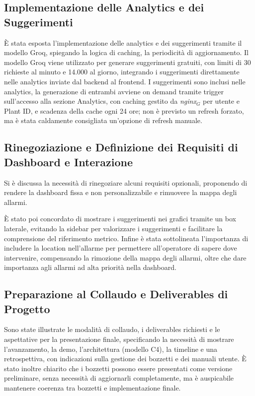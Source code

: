 \documentclass[10pt, letterpaper]{article}
\begin{document}
\subsection*{Implementazione delle Analytics e dei Suggerimenti}
È stata esposta l'implementazione delle analytics e dei suggerimenti tramite il modello Groq, spiegando la logica di caching, la periodicità di aggiornamento.
Il modello Groq viene utilizzato per generare suggerimenti gratuiti, con limiti di 30 richieste al minuto e 14.000 al giorno, integrando i suggerimenti direttamente nelle analytics inviate dal backend al frontend.
I suggerimenti sono inclusi nelle analytics, la generazione di entrambi avviene on demand tramite trigger sull'accesso alla sezione Analytics, con caching gestito da \textit{nginx$_G$} per utente e Plant ID,
e scadenza della cache ogni 24 ore; non è previsto un refresh forzato, ma è stata caldamente consigliata un'opzione di refresh manuale. 

\subsection*{Rinegoziazione e Definizione dei Requisiti di Dashboard e Interazione}
Si è discussa la necessità di rinegoziare alcuni requisiti opzionali, proponendo di rendere la dashboard fissa e non personalizzabile e rimuovere la mappa degli allarmi.

È stato poi concordato di mostrare i suggerimenti nei grafici tramite un box laterale, evitando la sidebar per valorizzare i suggerimenti e facilitare la comprensione del riferimento metrico. Infine è stata
sottolineata l'importanza di includere la location nell'allarme per permettere all'operatore di sapere dove intervenire, compensando la rimozione della mappa degli allarmi, oltre che dare importanza agli allarmi 
ad alta priorità nella dashboard.

\subsection*{Preparazione al Collaudo e Deliverables di Progetto}
Sono state illustrate le modalità di collaudo, i deliverables richiesti e le aspettative per la presentazione finale, specificando la necessità di mostrare l'avanzamento, la demo, l'architettura (modello C4), la timeline e una retrospettiva, con indicazioni sulla gestione dei bozzetti e dei manuali utente.
È stato inoltre chiarito che i bozzetti possono essere presentati come versione preliminare, senza necessità di aggiornarli completamente, ma è auspicabile mantenere coerenza tra bozzetti e implementazione finale.
\end{document}
